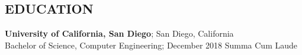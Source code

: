 \documentclass[margin]{res}
\begin{document}
\begin{resume}

\section{EDUCATION}
\textbf{University of California, San Diego}; San Diego, California\\
Bachelor of Science, Computer Engineering; December 2018\hfill 
Summa Cum Laude


\end{resume}
\end{document}
